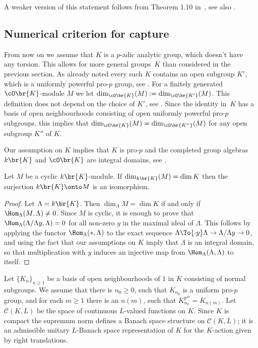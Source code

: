 \begin{remark} A weaker version of this statement follows from Theorem 1.10 in~\cite{harris}, see also \cite{harris_err}.
\end{remark}

\subsection{Numerical criterion for capture} From now on we assume that $K$ is
a $p$-adic analytic group, which doesn't have any torsion. This allows for
more general groups~$K$ than considered in the previous section. As already
noted every such $K$ contains an open subgroup $K'$, which is a uniformly
powerful pro-$p$ group, see \cite[Th.\,8.23]{analytic}. For a finitely
generated $\cO\br{K}$-module $M$ we let $\dim_{\cO\br{K}}(M):=
\dim_{\cO\br{K'}}(M)$. This definition does not depend on the choice of $K'$,
see \cite[\S 5.4]{ardakov_brown}. Since the identity in~$K$ has a basis of open
neighbourhoods consisting of open uniformly powerful pro-$p$ subgroups, this
implies that $\dim_{\cO\br{K}}(M)= \dim_{\cO\br{K''}}(M)$ for any open subgroup
$K''$ of $K$.

Our assumption on $K$ implies that $K$ is pro-$p$ and the completed group
algebras $k\br{K}$ and $\cO\br{K}$ are integral domains, see
\cite[Th.\,4.3]{ardakov_brown}.

\begin{lem}\label{dim_cyclic} Let $M$ be a cyclic $k\br{K}$-module. If
$\dim_{k\br{K}}(M)= \dim K$ then the surjection $k\br{K}\onto M$
is an isomorphism. \end{lem} 
\begin{proof} Let $\Lambda=k \br{K}$. Then
$\dim_{\Lambda} M = \dim K$ if and only if $\Hom_{\Lambda}(M, \Lambda)\neq 0$.
Since $M$ is cyclic, it is enough to prove that $\Hom_{\Lambda}(\Lambda/
\Lambda y, \Lambda)=0$ for all non-zero $y$ in the maximal ideal of $\Lambda$.
This follows by applying the functor $\Hom_{\Lambda}(\ast, \Lambda)$ to the
exact sequence $\Lambda \To{\cdot y} \Lambda\to
\Lambda/\Lambda y\to 0$, and using the fact that our assumptions on $K$
imply that $\Lambda$ is an integral domain, so that multiplication with $y$
induces an injective map from $\Hom_{\Lambda}(\Lambda, \Lambda)$ to itself.
\end{proof}

Let $\{K_n\}_{n\ge 1}$ be a basis of open neighbourhoods of $1$ in $K$
consisting of normal subgroups. We assume that there is $n_0\ge 0$, such that
$K_{n_0}$ is a uniform pro-$p$ group, and for each $m\ge 1$ there is an $n(m)$,
such that $K_{n_0}^{p^m}= K_{n(m)} $. Let $\mathcal C(K, L)$ be the space of
continuous $L$-valued functions on $K$. Since $K$ is compact the supremum norm
defines a Banach space structure on $\mathcal C(K, L)$; it is an admissible
unitary $L$-Banach space representation of $K$ for the $K$-action given by
right translations.

